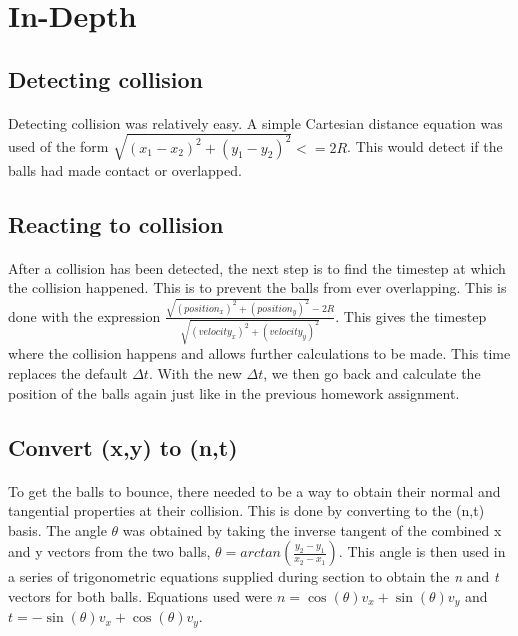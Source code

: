 \documentclass[12pt,final]{report}
\begin{document}
\section{In-Depth}
\subsection{Detecting collision}
\paragraph{}	Detecting collision was relatively easy. A simple Cartesian distance equation was used of the form \(\sqrt{(x_1 - x_2)^2 + (y_1 - y_2)^2} <= 2R\). This would detect if the balls had made contact or overlapped.

\subsection{Reacting to collision}
\paragraph{}	After a collision has been detected, the next step is to find the timestep at which the collision happened. This is to prevent the balls from ever overlapping. This is done with the expression \(\frac{\sqrt{(position_x)^2 + (position_y)^2} - 2R}{\sqrt{(velocity_x)^2 + (velocity_y)^2}}\). This gives the timestep where the collision happens and allows further calculations to be made. This time replaces the default \(\Delta t\). With the new \(\Delta t\), we then go back and calculate the position of the balls again just like in the previous homework assignment.

\subsection{Convert (x,y) to (n,t)}
\paragraph{}	To get the balls to bounce, there needed to be a way to obtain their normal and tangential properties at their collision. This is done by converting to the (n,t) basis. The angle \(\theta\) was obtained by taking the inverse tangent of the combined x and y vectors from the two balls, \(\theta = arctan(\frac{y_2 - y_1}{x_2 - x_1})\). This angle is then used in a series of trigonometric equations supplied during section to obtain the \textit{n} and \textit{t} vectors for both balls. Equations used were \(n = \cos(\theta)v_x + \sin(\theta)v_y\) and \(t = -\sin(\theta)v_x + \cos(\theta)v_y\).
\end{document}
